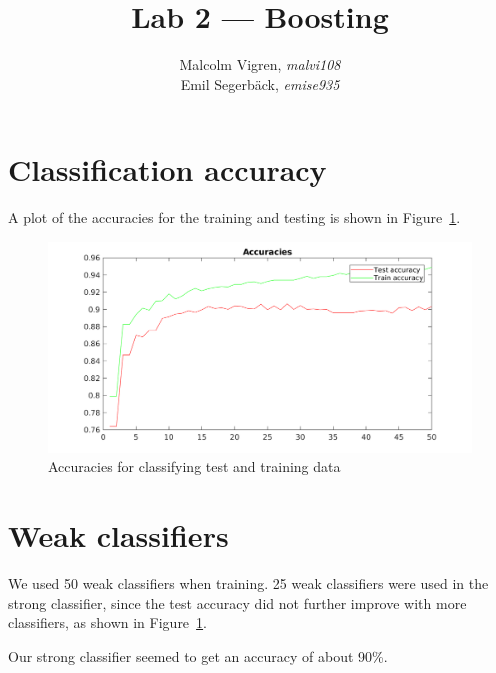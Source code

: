 \documentclass{article}
\begin{document}
\title{Lab 2 --- Boosting}
\author{Malcolm Vigren, \textit{malvi108} \\
        Emil Segerbäck, \textit{emise935}}

\maketitle

\section{Classification accuracy}

A plot of the accuracies for the training and testing is shown in Figure~\ref{fig:acc}.

\begin{figure}[h]
  \includegraphics[width=13cm]{accuracies.png}
  \caption{Accuracies for classifying test and training data}
  \label{fig:acc}
\end{figure}

\section{Weak classifiers}

We used 50 weak classifiers when training. 25 weak classifiers were
used in the strong classifier, since the test accuracy did not further
improve with more classifiers, as shown in Figure~\ref{fig:acc}.

Our strong classifier seemed to get an accuracy of about 90\%.
\end{document}
